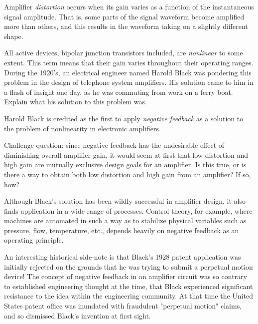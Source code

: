 

Amplifier {\it distortion} occurs when its gain varies as a function of the instantaneous signal amplitude.  That is, some parts of the signal waveform become amplified more than others, and this results in the waveform taking on a slightly different shape.

All active devices, bipolar junction transistors included, are {\it nonlinear} to some extent.  This term means that their gain varies throughout their operating ranges.  During the 1920's, an electrical engineer named Harold Black was pondering this problem in the design of telephone system amplifiers.  His solution came to him in a flash of insight one day, as he was commuting from work on a ferry boat.  Explain what his solution to this problem was.







Harold Black is credited as the first to apply {\it negative feedback} as a solution to the problem of nonlinearity in electronic amplifiers.

\vskip 10pt

Challenge question: since negative feedback has the undesirable effect of diminishing overall amplifier gain, it would seem at first that low distortion and high gain are mutually exclusive design goals for an amplifier.  Is this true, or is there a way to obtain both low distortion and high gain from an amplifier?  If so, how?







Although Black's solution has been wildly successful in amplifier design, it also finds application in a wide range of processes.  Control theory, for example, where machines are automated in such a way as to stabilize physical variables such as pressure, flow, temperature, etc., depends heavily on negative feedback as an operating principle.

An interesting historical side-note is that Black's 1928 patent application was initially rejected on the grounds that he was trying to submit a perpetual motion device!  The concept of negative feedback in an amplifier circuit was so contrary to established engineering thought at the time, that Black experienced significant resistance to the idea within the engineering community.  At that time the United States patent office was inundated with fraudulent "perpetual motion" claims, and so dismissed Black's invention at first sight.




